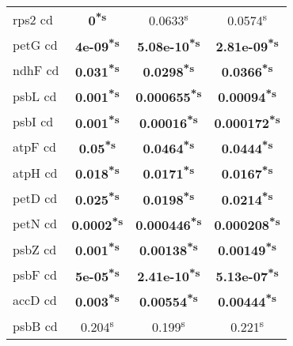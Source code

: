 \documentclass[a4paper]{article}
\begin{document}
\begin{longtable}{l|c|c|c}
rps2 cd&\textbf{0\textsuperscript{*}\textsuperscript{s}}&0.0633\textsuperscript{s}&0.0574\textsuperscript{s}\\
petG cd&\textbf{4e-09\textsuperscript{*}\textsuperscript{s}}&\textbf{5.08e-10\textsuperscript{*}\textsuperscript{s}}&\textbf{2.81e-09\textsuperscript{*}\textsuperscript{s}}\\
ndhF cd&\textbf{0.031\textsuperscript{*}\textsuperscript{s}}&\textbf{0.0298\textsuperscript{*}\textsuperscript{s}}&\textbf{0.0366\textsuperscript{*}\textsuperscript{s}}\\
psbL cd&\textbf{0.001\textsuperscript{*}\textsuperscript{s}}&\textbf{0.000655\textsuperscript{*}\textsuperscript{s}}&\textbf{0.00094\textsuperscript{*}\textsuperscript{s}}\\
psbI cd&\textbf{0.001\textsuperscript{*}\textsuperscript{s}}&\textbf{0.00016\textsuperscript{*}\textsuperscript{s}}&\textbf{0.000172\textsuperscript{*}\textsuperscript{s}}\\
atpF cd&\textbf{0.05\textsuperscript{*}\textsuperscript{s}}&\textbf{0.0464\textsuperscript{*}\textsuperscript{s}}&\textbf{0.0444\textsuperscript{*}\textsuperscript{s}}\\
atpH cd&\textbf{0.018\textsuperscript{*}\textsuperscript{s}}&\textbf{0.0171\textsuperscript{*}\textsuperscript{s}}&\textbf{0.0167\textsuperscript{*}\textsuperscript{s}}\\
petD cd&\textbf{0.025\textsuperscript{*}\textsuperscript{s}}&\textbf{0.0198\textsuperscript{*}\textsuperscript{s}}&\textbf{0.0214\textsuperscript{*}\textsuperscript{s}}\\
petN cd&\textbf{0.0002\textsuperscript{*}\textsuperscript{s}}&\textbf{0.000446\textsuperscript{*}\textsuperscript{s}}&\textbf{0.000208\textsuperscript{*}\textsuperscript{s}}\\
psbZ cd&\textbf{0.001\textsuperscript{*}\textsuperscript{s}}&\textbf{0.00138\textsuperscript{*}\textsuperscript{s}}&\textbf{0.00149\textsuperscript{*}\textsuperscript{s}}\\
psbF cd&\textbf{5e-05\textsuperscript{*}\textsuperscript{s}}&\textbf{2.41e-10\textsuperscript{*}\textsuperscript{s}}&\textbf{5.13e-07\textsuperscript{*}\textsuperscript{s}}\\
accD cd&\textbf{0.003\textsuperscript{*}\textsuperscript{s}}&\textbf{0.00554\textsuperscript{*}\textsuperscript{s}}&\textbf{0.00444\textsuperscript{*}\textsuperscript{s}}\\
psbB cd&0.204\textsuperscript{s}&0.199\textsuperscript{s}&0.221\textsuperscript{s}\\

\end{longtable}
\end{document}
